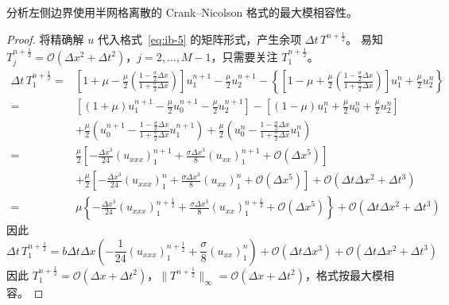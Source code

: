 \begin{example}
    分析左侧边界使用半网格离散的 Crank–Nicolson 格式的最大模相容性。
\end{example}

\begin{proof}
    将精确解 $u$ 代入格式~\eqref{eq:ib-5} 的矩阵形式，产生余项 $\Delta t \,T^{n+\frac12}$。
    易知 $T_j^{n+\frac12} = \mathcal{O}(\Delta x^2 + \Delta t^2)$，$j=2,\dots,M-1$，只需要关注 $T_1^{n+\frac12}$。
    \begin{align*}
        \Delta t\, T_1^{n+\frac12} ={} &
        \left[ 1 + \mu - \frac{\mu}{2}\left(\frac{1-\frac{\sigma}2 \Delta x}{1 +\frac{\sigma}2 \Delta x}\right) \right] u_1^{n+1} - \frac{\mu}2 u_2^{n+1}
        - \left\{\left[ 1 - \mu + \frac{\mu}{2}\left(\frac{1-\frac{\sigma}2 \Delta x}{1 +\frac{\sigma}2 \Delta x}\right) \right] u_1^{n} + \frac{\mu}2 u_2^{n}\right\}              \\
        ={}                            & \left[
        (1+\mu) u_1^{n+1} - \frac{\mu}2 u_0^{n+1} - \frac{\mu}2 u_2^{n+1}
        \right]
        -
        \left[
        (1-\mu) u_1^{n} + \frac{\mu}2 u_0^{n} + \frac{\mu}2 u_2^{n}
        \right]                                                                                                                                                                     \\
                                       & + \frac{\mu}2 \left( u_0^{n+1} - \frac{1-\frac{\sigma}2 \Delta x}{1 +\frac{\sigma}2 \Delta x}u_1^{n+1} \right)
        + \frac{\mu}2 \left( u_0^{n} - \frac{1-\frac{\sigma}2 \Delta x}{1 +\frac{\sigma}2 \Delta x}u_1^{n} \right)                                                                  \\
        ={}                            & \frac{\mu}2 \left[ -\frac{\Delta x^3}{24} (u_{xxx})_1^{n+1} + \frac{\sigma \Delta x^3}8 (u_{xx})_1^{n+1} + \mathcal{O}(\Delta x^5) \right]
        \\ &+ \frac{\mu}2 \left[ -\frac{\Delta x^3}{24} (u_{xxx})_1^n + \frac{\sigma \Delta x^3}8 (u_{xx})_1^n + \mathcal{O}(\Delta x^5) \right]
        + \mathcal{O}(\Delta t \Delta x^2 + \Delta t^3)                                                                                                                             \\
        ={}                            & \mu \left\{
        -\frac{\Delta x^3}{24} (u_{xxx})_1^{n+\frac12} + \frac{\sigma \Delta x^3}8 (u_{xx})_1^{n+\frac12} + \mathcal{O}(\Delta x^5)
        \right\} + \mathcal{O}(\Delta t \Delta x^2 + \Delta t^3)
    \end{align*}
    因此
    \[
        \Delta t\, T_1^{n+\frac12} ={} b \Delta t \Delta x \left( -\frac1{24} (u_{xxx})_1^{n+\frac12} + \frac{\sigma}8 (u_{xx})_1^n \right)
        + \mathcal{O}(\Delta t\Delta x^3) + \mathcal{O}( \Delta t \Delta x^2 + \Delta t^3)
    \]
    因此 $T_1^{n+\frac12} = \mathcal{O}(\Delta x + \Delta t^2)$，$\|T^{n+\frac12}\|_{\infty} = \mathcal{O}(\Delta x + \Delta t^2)$，格式按最大模相容。
\end{proof}

